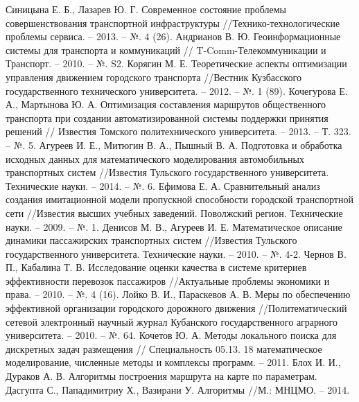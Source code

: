 \begin{thebibliography}{10}
     Синицына Е. Б., Лазарев Ю. Г. Современное состояние проблемы совершенствования 
        транспортной инфраструктуры //Технико-технологические проблемы сервиса. -- 2013. -- №. 4 (26).
     Андрианов В. Ю. Геоинформационные системы для транспорта и коммуникаций //
        T-Comm-Телекоммуникации и Транспорт. -- 2010. -- №. S2.
     Корягин М. Е. Теоретические аспекты оптимизации управления движением городского 
        транспорта //Вестник Кузбасского государственного технического университета. -- 2012. -- №. 1 (89).
     Кочегурова Е. А., Мартынова Ю. А. Оптимизация составления маршрутов общественного 
        транспорта при создании автоматизированной системы поддержки принятия решений //
        Известия Томского политехнического университета. -- 2013. -- Т. 323. -- №. 5.
     Агуреев И. Е., Митюгин В. А., Пышный В. А. Подготовка и обработка исходных данных 
        для математического моделирования автомобильных транспортных систем //Известия Тульского 
        государственного университета. Технические науки. -- 2014. -- №. 6.
     Ефимова Е. А. Сравнительный анализ создания имитационной модели пропускной 
        способности городской транспортной сети //Известия высших учебных заведений. Поволжский регион. 
        Технические науки. -- 2009. -- №. 1.
     Денисов М. В., Агуреев И. Е. Математическое описание динамики пассажирских 
        транспортных систем //Известия Тульского государственного университета. 
        Технические науки. -- 2010. -- №. 4-2.
     Чернов В. П., Кабалина Т. В. Исследование оценки качества в системе критериев 
        эффективности перевозок пассажиров //Актуальные проблемы экономики и права. -- 2010. -- №. 4 (16).
     Лойко В. И., Параскевов А. В. Меры по обеспечению эффективной организации городского 
        дорожного движения //Политематический сетевой электронный научный журнал Кубанского 
        государственного аграрного университета. -- 2010. -- №. 64.
     Кочетов Ю. А. Методы локального поиска для дискретных задач размещения //
        Специальность 05.13. 18 математическое моделирование, численные методы и 
        комплексы программ. -- 2011.
     Блох И. И., Дураков А. В. Алгоритмы построения маршрута на карте по параметрам.
     Дасгупта С., Пападимитриу Х., Вазирани У. Алгоритмы //М.: МНЦМО. -- 2014.
    

\end{thebibliography}
